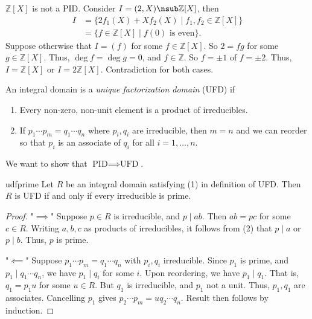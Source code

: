 \begin{example}
    \(\mathbb{Z}[X]\) is not a PID. Consider \(I = (2, X) \nsub \mathbb{Z}[X]\), then
    \begin{align*}
        I &= \{2f_1(X) + X f_2(X) \mid f_1, f_2 \in \mathbb{Z}[X]\}\\
        &=\{f\in \mathbb{Z}[X]\mid f(0)\text{ is even}\}.
    \end{align*}
    Suppose otherwise that \(I = (f)\) for some \(f \in \mathbb{Z}[X]\). So \(2 = fg\) for some \(g \in \mathbb{Z}[X]\). Thus, \(\deg f = \deg g = 0\), and \(f \in \mathbb{Z}\). So \(f = \pm 1\) of \(f = \pm 2\). Thus, \(I = \mathbb{Z}[X]\) or \(I = 2\mathbb{Z}[X]\). Contradiction for both cases.
\end{example}
\begin{definition}{}{}
    An integral domain is a \textit{unique factorization domain} (UFD) if
    \begin{enumerate}
        \item Every non-zero, non-unit element is a product of irreducibles.
        \item If \(p_1\cdots p_m = q_1 \cdots q_n\) where \(p_i,q_i\) are irreducible, then \(m = n\) and we can reorder so that \(p_i\) is an associate of \(q_i\) for all \(i = 1, \ldots, n\).
    \end{enumerate}
\end{definition}
We want to show that \(\text{PID}\implies \text{UFD}\).
\begin{proposition}{}{udfprime}
    Let \(R\) be an integral domain satisfying (1) in definition of UFD. Then \(R\) is UFD if and only if every irreducible is prime.
\end{proposition}
\begin{proof}
    "\(\implies\)" Suppose \(p \in R\) is irreducible, and \(p \mid ab\). Then \(ab = pc\) for some \(c \in R\). Writing \(a,b,c\) as products of irreducibles, it follows from (2) that \(p \mid a\) or \(p \mid b\). Thus, \(p\) is prime.

    "\(\impliedby\)" Suppose \(p_1\cdots p_m = q_1 \cdots q_n\) with \(p_i, q_i\) irreducible. Since \(p_1\) is prime, and \(p_1 \mid q_1 \cdots q_n\), we have \(p_1 \mid q_i\) for some \(i\). Upon reordering, we have \(p_1 \mid q_1\). That is, \(q_1 = p_1 u\) for some \(u \in R\). But \(q_1\) is irreducible, and \(p_1\) not a unit. Thus, \(p_1, q_1\) are associates. Cancelling \(p_1\) gives \(p_2 \cdots p_m = uq_2 \cdots q_n\). Result then follows by induction.
\end{proof}

